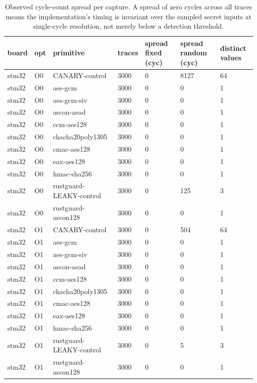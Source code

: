 \begin{table}[t]
  \centering
  \caption{Observed cycle-count spread per capture. A spread of zero cycles across all traces means the implementation's timing is invariant over the sampled secret inputs at single-cycle resolution, not merely below a detection threshold.}
  \label{tab:resolution}
  \begin{tabular}{lllllll}
    \toprule
    board & opt & primitive & traces & spread fixed (cyc) & spread random (cyc) & distinct values \\
    \midrule
    stm32 & O0 & CANARY-control & 3000 & 0 & 8127 & 64 \\
    stm32 & O0 & aes-gcm & 3000 & 0 & 0 & 1 \\
    stm32 & O0 & aes-gcm-siv & 3000 & 0 & 0 & 1 \\
    stm32 & O0 & ascon-aead & 3000 & 0 & 0 & 1 \\
    stm32 & O0 & ccm-aes128 & 3000 & 0 & 0 & 1 \\
    stm32 & O0 & chacha20poly1305 & 3000 & 0 & 0 & 1 \\
    stm32 & O0 & cmac-aes128 & 3000 & 0 & 0 & 1 \\
    stm32 & O0 & eax-aes128 & 3000 & 0 & 0 & 1 \\
    stm32 & O0 & hmac-sha256 & 3000 & 0 & 0 & 1 \\
    stm32 & O0 & rustguard-LEAKY-control & 3000 & 0 & 125 & 3 \\
    stm32 & O0 & rustguard-ascon128 & 3000 & 0 & 0 & 1 \\
    stm32 & O1 & CANARY-control & 3000 & 0 & 504 & 64 \\
    stm32 & O1 & aes-gcm & 3000 & 0 & 0 & 1 \\
    stm32 & O1 & aes-gcm-siv & 3000 & 0 & 0 & 1 \\
    stm32 & O1 & ascon-aead & 3000 & 0 & 0 & 1 \\
    stm32 & O1 & ccm-aes128 & 3000 & 0 & 0 & 1 \\
    stm32 & O1 & chacha20poly1305 & 3000 & 0 & 0 & 1 \\
    stm32 & O1 & cmac-aes128 & 3000 & 0 & 0 & 1 \\
    stm32 & O1 & eax-aes128 & 3000 & 0 & 0 & 1 \\
    stm32 & O1 & hmac-sha256 & 3000 & 0 & 0 & 1 \\
    stm32 & O1 & rustguard-LEAKY-control & 3000 & 0 & 5 & 3 \\
    stm32 & O1 & rustguard-ascon128 & 3000 & 0 & 0 & 1 \\

\end{tabular}
\end{table}
